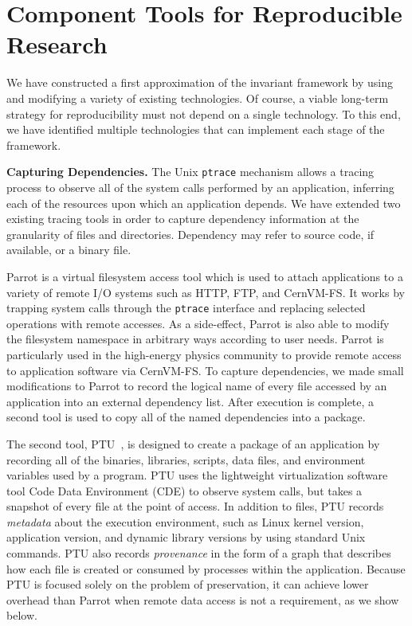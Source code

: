 \section{Component Tools for Reproducible Research}

We have constructed a first approximation of the invariant framework
by using and modifying a variety of existing technologies.  Of course,
a viable long-term strategy for reproducibility must not depend on a single
technology.
To this end, we have identified multiple technologies 
that can implement each stage of the framework.

{\bf Capturing Dependencies.}  
The Unix {\tt ptrace} mechanism
allows a tracing process to observe all of the system calls performed by
an application, inferring each of the resources upon which an application
depends.  We have extended two existing tracing tools in order to capture
dependency information at the granularity of files and directories. 
Dependency may refer to source code, if available, or a binary file.

Parrot is a virtual filesystem access tool which
is used to attach applications to a variety of remote I/O systems such as HTTP, FTP, and CernVM-FS. It works by trapping system calls through the {\tt ptrace} interface and replacing selected operations with remote accesses.  As a side-effect, Parrot is
also able to modify the filesystem namespace in arbitrary ways according to user
needs. Parrot is particularly used in the high-energy physics community
to provide remote access to application software via CernVM-FS.
To capture dependencies, we made small modifications to Parrot to record
the logical name of every file accessed by an application into an external
dependency list.  After execution is complete, a second tool is used to copy
all of the named dependencies into a package.

The second tool, PTU~\cite{pham2014framework}, is designed to create a package of an application by recording all of the binaries, libraries, scripts, data files, and environment variables used by a program.   PTU uses the lightweight virtualization software tool Code Data Environment (CDE) to observe system calls, but takes a snapshot of every file at the point of access. In addition to files, PTU records \emph{metadata} about the execution environment, such as Linux kernel version, application version, and dynamic library versions by using standard Unix commands.  PTU also records \emph{provenance} in the form of a graph that describes how each file is created or consumed by processes within the application.  Because PTU is focused solely on the problem of preservation, it can achieve lower overhead than Parrot when remote data access is not a requirement, as we show below.

